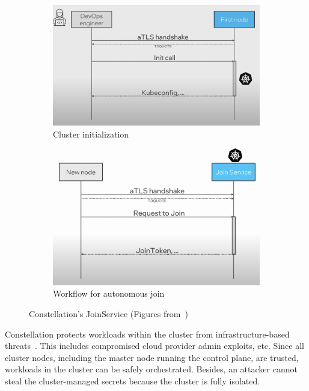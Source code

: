 \begin{figure}[htp]
    \centering
    \begin{subfigure}[b]{0.45\textwidth}
        \centering
        \includegraphics[width=\textwidth]{images/constellation_join_1.png}
        \caption{Cluster initialization}
        \label{fig:constellation_join_1}
    \end{subfigure}
    \hfill
    \begin{subfigure}[b]{0.45\textwidth}
        \centering
        \includegraphics[width=\textwidth]{images/constellation_join_2.png}
        \caption{Workflow for autonomous join}
        \label{fig:constellation_join_2}
    \end{subfigure}
    \hfill
       \caption[Constellation's JoinService]{Constellation's JoinService (Figures from~\cite*{constellation_join_Node})}
       \label{fig:constellation_join}
\end{figure}

Constellation protects workloads within the cluster from infrastructure-based threats~\cite*{Constellation_Always_encrypted}. This includes compromised cloud provider admin exploits, etc. Since all cluster nodes, including the master node running the control plane, are trusted, workloads in the 
cluster can be safely orchestrated. Besides, an attacker cannot steal the cluster-managed secrets because the cluster is fully isolated.
 
